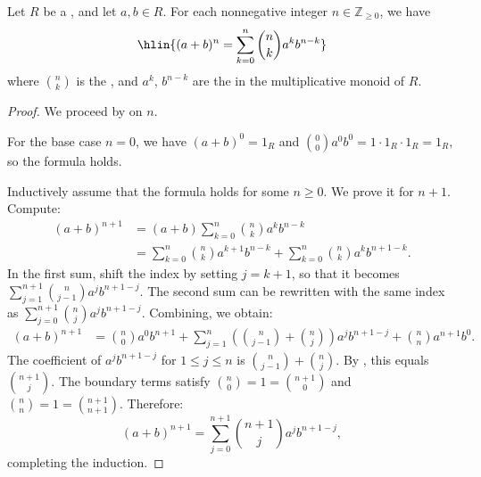 \begin{theorem} \label{theorem:binomial_theorem_for_a_commutative_ring}
    Let $R$ be a , and let $a, b \in R$. For each nonnegative integer $n \in \mathbb{Z}_{\geq 0}$, we have
    $$\hlin{(a + b)^n = \sum_{k=0}^n \binom{n}{k} a^k b^{n-k}}$$
    where $\binom{n}{k}$ is the , and $a^k$, $b^{n-k}$ are the  in the multiplicative monoid of $R$.
\end{theorem}

\begin{proof}
    We proceed by  on $n$.

    For the base case $n = 0$, we have $(a + b)^0 = 1_R$ and $\binom{0}{0} a^0 b^0 = 1 \cdot 1_R \cdot 1_R = 1_R$, so the formula holds.

    Inductively assume that the formula holds for some $n \geq 0$. We prove it for $n + 1$. Compute:
    $$\begin{aligned}
        (a + b)^{n+1} &= (a + b) \sum_{k=0}^n \binom{n}{k} a^k b^{n-k} \\
        &= \sum_{k=0}^n \binom{n}{k} a^{k+1} b^{n-k} + \sum_{k=0}^n \binom{n}{k} a^k b^{n+1-k}.
    \end{aligned}$$
    In the first sum, shift the index by setting $j = k + 1$, so that it becomes $\sum_{j=1}^{n+1} \binom{n}{j-1} a^j b^{n+1-j}$. The second sum can be rewritten with the same index as $\sum_{j=0}^{n+1} \binom{n}{j} a^j b^{n+1-j}$. Combining, we obtain:
    $$\begin{aligned}
        (a + b)^{n+1} &= \binom{n}{0} a^0 b^{n+1} + \sum_{j=1}^n \left( \binom{n}{j-1} + \binom{n}{j} \right) a^j b^{n+1-j} + \binom{n}{n} a^{n+1} b^0.
    \end{aligned}$$
    The coefficient of $a^j b^{n+1-j}$ for $1 \leq j \leq n$ is $\binom{n}{j-1} + \binom{n}{j}$. By , this equals $\binom{n+1}{j}$. The boundary terms satisfy $\binom{n}{0} = 1 = \binom{n+1}{0}$ and $\binom{n}{n} = 1 = \binom{n+1}{n+1}$. Therefore:
    $$(a + b)^{n+1} = \sum_{j=0}^{n+1} \binom{n+1}{j} a^j b^{n+1-j},$$
    completing the induction.
\end{proof}
